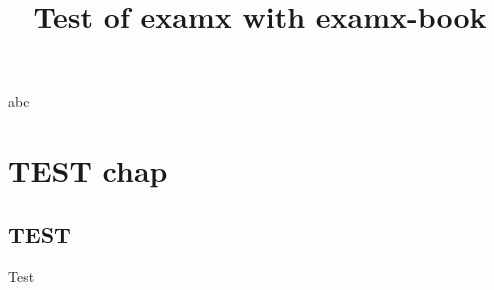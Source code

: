 \documentclass{article}
\title{Test of examx with examx-book}
\begin{document}
    \maketitle
    
    
    
    abc
    \chapter{TEST chap}
    \section{TEST}
    Test
\end{document}
